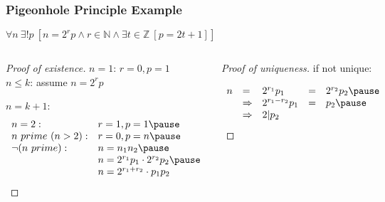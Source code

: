 \documentclass[dvipsnames]{beamer}
\begin{document}
\begin{frame}
  \frametitle{Pigeonhole Principle Example}

  \begin{theorem}
    $\forall n~\exists ! p~
      [n = 2^r p \wedge r \in \mathbb{N}
        \wedge \exists t \in \mathbb Z~[p = 2t + 1]]$\\
  \end{theorem}

  \pause
  \begin{columns}[t]
    \begin{proof}[Proof of existence]
      $n = 1$: $r = 0, p = 1$\\

      \pause
      $n \leq k$: assume $n = 2^r p$

      \pause
      $n = k + 1$:
      \vspace{-9pt}
      \[
        \begin{array}{ll}
          n=2:            & r = 1, p = 1\pause\\
          n~prime~(n>2):  & r = 0, p = n\pause\\
          \neg (n~prime): & n = n_1 n_2\pause\\
                          & n = 2^{r_1} p_1 \cdot 2^{r_2} p_2\pause\\
                          & n = 2^{r_1+r_2} \cdot p_1 p_2
        \end{array}
      \]
    \end{proof}

    \pause
    \begin{proof}[Proof of uniqueness]
      if not unique:

      \pause
      \[
        \begin{array}{lllll}
          n & =           & 2^{r_1} p_1     & = & 2^{r_2} p_2\pause\\
            & \Rightarrow & 2^{r_1-r_2} p_1 & = & p_2\pause\\
            & \Rightarrow & 2 | p_2
        \end{array}
      \]
    \end{proof}
  \end{columns}
\end{frame}
\end{document}
